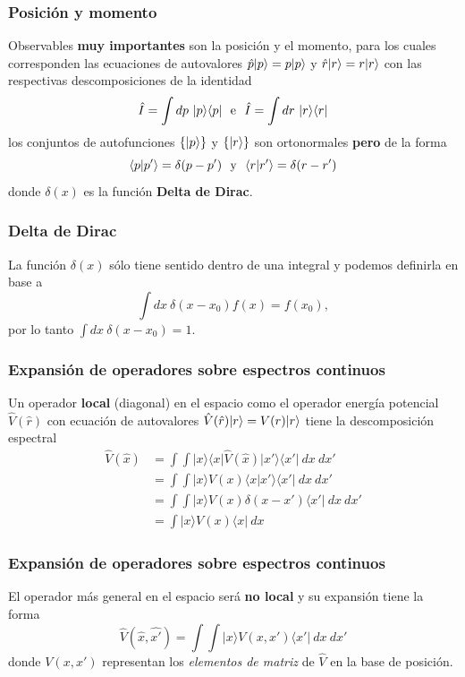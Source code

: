 \documentclass{beamer}
\begin{document}
\begin{frame}
    \frametitle{Posición y momento}
    Observables {\bf muy importantes} son la posición y el momento, para los cuales corresponden las ecuaciones de autovalores $\hat{p}| p \rangle=p| p \rangle$ y $\hat{r}| r \rangle=r| r \rangle$ con las respectivas descomposiciones de la identidad
    $$\hat{I}=\int dp\ \ket{p}\bra{p} \ \ \mathrm{e}\ \   \hat{I}=\int dr\ \ket{r}\bra{r}$$
    los conjuntos de autofunciones $\{| p \rangle\}$ y $\{| r \rangle\}$ son ortonormales {\bf pero} de la forma
    $$\braket{p}{p'}=\delta(p-p')\ \ \mathrm{y}\ \ \braket{r}{r'}=\delta(r-r')$$
    donde $\delta(x)$ es la función {\bf Delta de Dirac}.
\end{frame}

\begin{frame}
    \frametitle{Delta de Dirac}
    La función $\delta(x)$ sólo tiene sentido dentro de una integral y podemos definirla en base a
    $$\int dx\ \delta(x-x_0)f(x) = f(x_0),$$
    por lo tanto $\int dx\ \delta(x-x_0) = 1$.
\end{frame}

\begin{frame}
    \frametitle{Expansión de operadores sobre espectros continuos}
    Un operador {\bf local} (diagonal) en el espacio como el operador energía potencial $\hat{V}(\hat{r})$ con ecuación de autovalores $\hat{V}(\hat{r})| r \rangle=V(r)| r \rangle$ tiene la descomposición espectral
    \begin{equation*}
        \begin{split}
        \hat{V}(\hat{x})&=\int\int |x\rangle\langle x|\hat{V}(\hat{x})|x'\rangle\langle x'|\ dx\ dx' \\
        &=\int\int |x\rangle V(x)\langle x|x'\rangle\langle x'|\ dx\ dx'\\
        &=\int\int |x\rangle V(x)\delta(x-x')\langle x'|\ dx\ dx'\\
        &=\int |x\rangle V(x)\langle x|\ dx
    \end{split}
\end{equation*}

\end{frame}

\begin{frame}
    \frametitle{Expansión de operadores sobre espectros continuos}
    El operador más general en el espacio será {\bf no local} y su expansión tiene la forma  
        $$\hat{V}(\hat{x},\hat{x'})=\int\int |x\rangle V(x,x')\langle x'|\ dx\ dx' $$
    donde $V(x,x')$ representan los {\em elementos de matriz} de $\hat{V}$ en la base de posición.

\end{frame}
\end{document}
